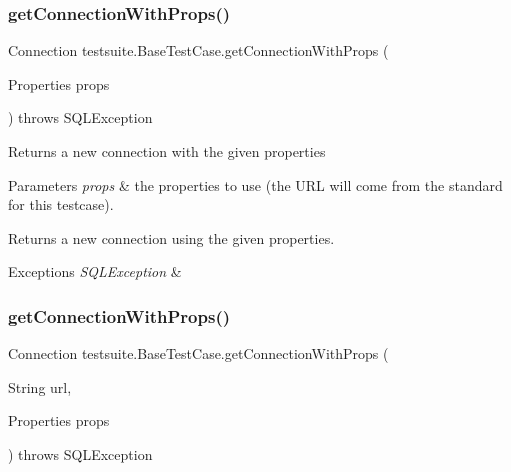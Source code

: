 \subsubsection{\texorpdfstring{get\+Connection\+With\+Props()}{getConnectionWithProps()}\hspace{0.1cm}{\footnotesize\ttfamily [3/4]}}
{\footnotesize\ttfamily Connection testsuite.\+Base\+Test\+Case.\+get\+Connection\+With\+Props (\begin{DoxyParamCaption}\item[{Properties}]{props }\end{DoxyParamCaption}) throws S\+Q\+L\+Exception}

Returns a new connection with the given properties


\begin{DoxyParams}{Parameters}
{\em props} & the properties to use (the U\+RL will come from the standard for this testcase).\\
\hline
\end{DoxyParams}
\begin{DoxyReturn}{Returns}
a new connection using the given properties.
\end{DoxyReturn}

\begin{DoxyExceptions}{Exceptions}
{\em S\+Q\+L\+Exception} & \\
\hline
\end{DoxyExceptions}
\mbox{\label{classtestsuite_1_1_base_test_case_a63736613e1c2617aa290baa6ecadaf1b}} 
\subsubsection{\texorpdfstring{get\+Connection\+With\+Props()}{getConnectionWithProps()}\hspace{0.1cm}{\footnotesize\ttfamily [4/4]}}
{\footnotesize\ttfamily Connection testsuite.\+Base\+Test\+Case.\+get\+Connection\+With\+Props (\begin{DoxyParamCaption}\item[{String}]{url,  }\item[{Properties}]{props }\end{DoxyParamCaption}) throws S\+Q\+L\+Exception\hspace{0.3cm}{\ttfamily [protected]}}

